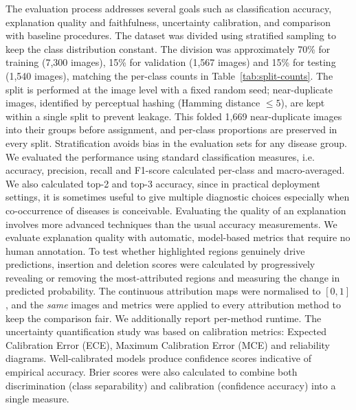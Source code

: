 \documentclass[pdflatex,sn-mathphys-num]{sn-jnl}%
\begin{document}
The evaluation process addresses several goals such as classification accuracy, explanation quality and faithfulness, uncertainty calibration, and comparison with baseline procedures. The dataset was divided using stratified sampling to keep the class distribution constant. The division was approximately 70\% for training (7,300 images), 15\% for validation (1,567 images) and 15\% for testing (1,540 images), matching the per-class counts in Table~\ref{tab:split-counts}. The split is performed at the image level with a fixed random seed; near-duplicate images, identified by perceptual hashing (Hamming distance $\leq 5$), are kept within a single split to prevent leakage. This folded 1,669 near-duplicate images into their groups before assignment, and per-class proportions are preserved in every split. Stratification avoids bias in the evaluation sets for any disease group.
We evaluated the performance using standard classification measures, i.e. accuracy, precision, recall and F1-score calculated per-class and macro-averaged. We also calculated top-2 and top-3 accuracy, since in practical deployment settings, it is sometimes useful to give multiple diagnostic choices especially when co-occurrence of diseases is conceivable. Evaluating the quality of an explanation involves more advanced techniques than the usual accuracy measurements. We evaluate explanation quality with automatic, model-based metrics that require no human annotation. To test whether highlighted regions genuinely drive predictions, insertion and deletion scores were calculated \cite{petsiuk2018rise} by progressively revealing or removing the most-attributed regions and measuring the change in predicted probability. The continuous attribution maps were normalised to $[0,1]$, and the \emph{same} images and metrics were applied to every attribution method to keep the comparison fair. We additionally report per-method runtime. The uncertainty quantification study was based on calibration metrics: Expected Calibration Error (ECE), Maximum Calibration Error (MCE) and reliability diagrams. Well-calibrated models produce confidence scores indicative of empirical accuracy. Brier scores were also calculated to combine both discrimination (class separability) and calibration (confidence accuracy) into a single measure. 
\end{document}
